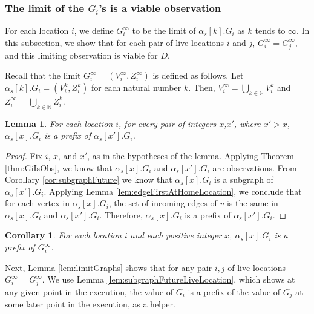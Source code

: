 \documentclass[11pt]{article}
\numberwithin{theorem}{section}
\newtheorem{lemma}[theorem]{Lemma}
\newtheorem{corollary}[theorem]{Corollary}
\begin{document}
\subsubsection{The limit of the $G_i$'s is a viable observation}
\label{subsubsec:proofLimitObsIsViable}



For each location $i$, we define $G_i^\infty$ to be the limit of $\alpha_s[k].G_i$ as $k$ tends to $\infty$. In this subsection, we show that
for each pair of live locations $i$ and $j$, $G_i^\infty = G_j^\infty$, and this limiting observation is viable for $D$.

Recall that the limit $G^\infty_i = (V^\infty_i,Z^\infty_i)$ is defined as follows. Let $\alpha_s[k].G_i = (V^k_i,Z^k_i)$ for each natural number $k$. Then, $V^\infty_i = \bigcup_{k \in \mathbb{N}} V^k_i$ and $Z^\infty_i = \bigcup_{k \in \mathbb{N}} Z^k_i$.



\begin{lemma}
\label{lem:prefixOfFutureObs}
For each location $i$, for every pair of integers $x$,$x'$, where
$x'>x$,  $\alpha_s[x].G_i$ is a prefix of $\alpha_s[x'].G_i$.
\end{lemma} 

\begin{proof}
Fix $i$, $x$, and $x'$, as in the hypotheses of the lemma. Applying Theorem
\ref{thm:GiIsObs}, we know that $\alpha_s[x].G_i$ and $\alpha_s[x'].G_i$ are
observations.
From Corollary \ref{cor:subgraphFuture} we know that $\alpha_s[x].G_i$ is a
subgraph of $\alpha_s[x'].G_i$. Applying Lemma
\ref{lem:edgeFirstAtHomeLocation}, we conclude that for each vertex in
$\alpha_s[x].G_i$, the set of incoming edges of $v$ is the same in
$\alpha_s[x].G_i$ and $\alpha_s[x'].G_i$. Therefore, $\alpha_s[x].G_i$
is a prefix of $\alpha_s[x'].G_i$.
\end{proof}







\begin{corollary}\label{cor:ObsPrefixOfLimit}
For each location $i$ and each positive integer $x$, $\alpha_s[x].G_i$
is a prefix of $G_i^\infty$.
\end{corollary}

Next, Lemma \ref{lem:limitGraphs} shows that for any pair $i,j$ of live locations $G_i^\infty = G_j^\infty$. We use Lemma \ref{lem:subgraphFutureLiveLocation}, which shows at any given point in the execution, the value of $G_i$ is a prefix of the value of $G_j$ at some later point in the execution, as a helper.
\end{document}
